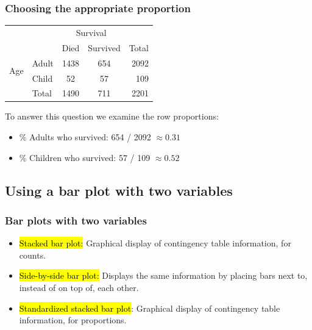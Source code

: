 \documentclass[slidestop,compress,mathserif]{beamer}
\begin{document}
\begin{frame}
\frametitle{Choosing the appropriate proportion}


\begin{center}
\begin{tabular}{l l cc r}
					               & 			 & \multicolumn{2}{c}{{Survival}} \\
  \cline{3-4}
					               &			 & Died	 & Survived	& Total \\ 
  \cline{2-5}
\multirow{2}{*}{{Age}}& Adult & 1438  & 654 	  	& 2092 \\ 
  					             & Child & 52 	 & 57	 	    & 109\\ 
  \cline{2-5}
  					             & Total & 1490  & 711	    &  2201 \\
  \cline{2-5}
\end{tabular}
\end{center}

\pause

To answer this question we examine the row proportions: 

\pause

\begin{itemize}

\item \% Adults who survived: 654 / 2092 $\approx 0.31$ \\

\pause

\item \% Children who survived: 57 / 109 $\approx 0.52$ \\

\end{itemize}

\end{frame}


\subsection{Using a bar plot with two variables}


\begin{frame}
\frametitle{Bar plots with two variables}

\begin{itemize}

\item \hl{Stacked bar plot:} Graphical display of contingency table information,
for counts.

\item \hl{Side-by-side bar plot:} Displays the same information by placing bars 
next to, instead of on top of, each other.

\item \hl{Standardized stacked bar plot}: Graphical display of contingency table 
information, for proportions.

\end{itemize}

\end{frame}
\end{document}
